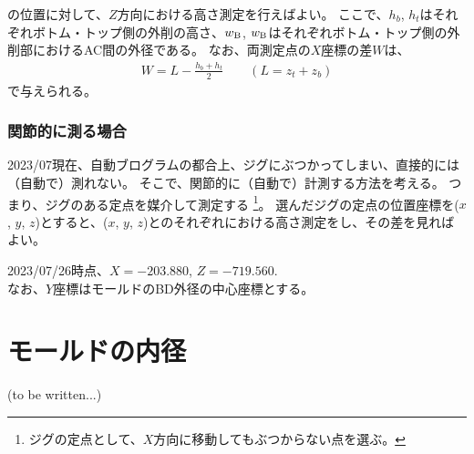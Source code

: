 の位置に対して、$Z$方向における高さ測定を行えばよい。
ここで、$h_b$, $h_t$はそれぞれボトム・トップ側の外削の高さ、$w_\text B$, $w_\text B$はそれぞれボトム・トップ側の外削部におけるAC間の外径である。
なお、両測定点の$X$座標の差$W$は、
\begin{align*}
  W = L-\frac{h_b+h_t}2 \qquad \left(L = z_t + z_b\right)
\end{align*}
で与えられる。



\subsection{関節的に測る場合}
2023/07現在、自動ブログラムの都合上、ジグにぶつかってしまい、直接的には（自動で）測れない。
そこで、関節的に（自動で）計測する方法を考える。
つまり、ジグのある定点を媒介して測定する
\footnote{ジグの定点として、$X$方向に移動してもぶつからない点を選ぶ。}。
選んだジグの定点の位置座標を($x$, $y$, $z$)とすると、($x$, $y$, $z$)とのそれぞれにおける高さ測定をし、その差を見ればよい。
\begin{tcolorbox}[fonttitle=\gtfamily\bfseries]
2023/07/26時点、$X = -203.880$, $Z = -719.560$.\\
なお、$Y$座標はモールドのBD外径の中心座標とする。
\end{tcolorbox}




\chapter{モールドの内径}
%
(to be written...)



